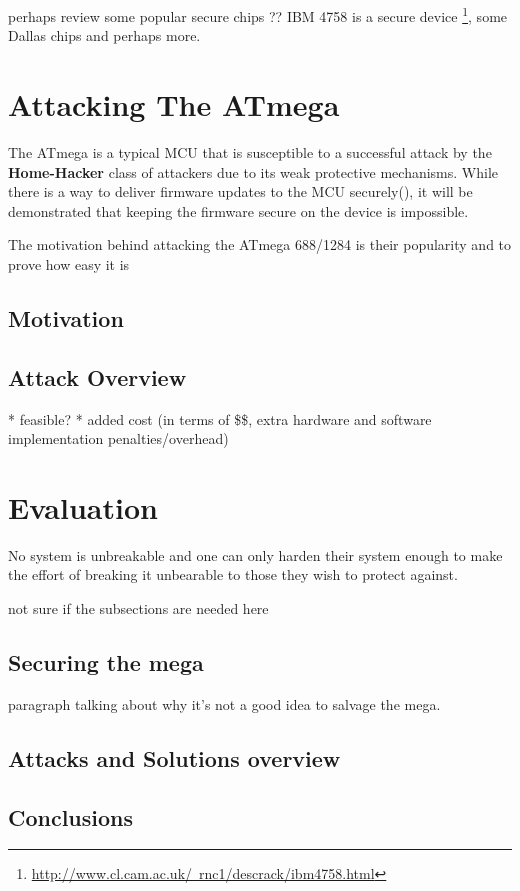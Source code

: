 \documentclass[10pt,a4paper,twocolumn]{article}
\begin{document}
	perhaps review some popular secure chips ?? IBM 4758 is a secure device \footnote{\href{http://www.cl.cam.ac.uk/~rnc1/descrack/ibm4758.html}{http://www.cl.cam.ac.uk/~rnc1/descrack/ibm4758.html}}, some Dallas chips and perhaps more.
	
	

\section{Attacking The ATmega}
\label{sec:attacking_mega}

The ATmega is a typical MCU that is susceptible to a successful attack by the \textbf{Home-Hacker} class of attackers due to its weak protective mechanisms. While there is a way to deliver firmware updates to the MCU securely(\citep{tech:aes_bls}), it will be demonstrated that keeping the firmware secure on the device is impossible.

The motivation behind attacking the ATmega 688/1284 is their popularity and to prove how easy it is

	\subsection{Motivation}
	
	\subsection{Attack Overview}
		* feasible? 
		* added cost (in terms of \$\$, extra hardware and software implementation penalties/overhead)
	

\section{Evaluation}
\label{sec:conclusion}

No system is unbreakable and one can only harden their system enough to make the effort of breaking it unbearable to those they wish to protect against\citep{anderson:cautionary_note}\cite{website:scorobogatov_breaking_copy_protection}.

	not sure if the subsections are needed here
	\subsection{Securing the mega}
		paragraph talking about why it's not a good idea to salvage the mega.
	\subsection{Attacks and Solutions overview}
	\subsection{Conclusions}
	
	
		
	
\end{document}
